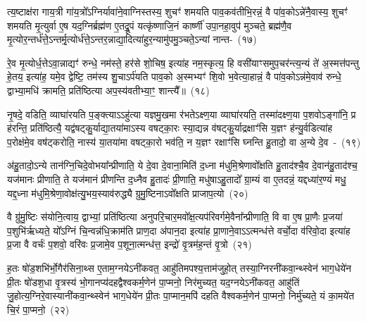 त्य॒ष्टाक्ष॑रा गाय॒त्री गा॑य॒त्रो᳚\-ऽग्निर्यावा॑ने॒वाग्निस्तस्य॒ शुचꣳ॑ शमयति पाव॒कव॑तीभि॒रन्नं॒ वै पा॑व॒को\-ऽन्ने॑नै॒वास्य॒ शुचꣳ॑ शमयति मृ॒त्युर्वा ए॒ष यद॒ग्निर्ब्रह्म॑ण ए॒तद्रू॒पं यत्कृ॑ष्णाजि॒नं कार्\mbox{}ष्णी॑ उपा॒नहा॒वुप॑ मुञ्चते॒ ब्रह्म॑णै॒व मृ॒त्योर॒न्तर्ध॑त्ते॒\-ऽन्तर्मृ॒त्योर्ध॑त्ते॒\-ऽन्तर॒न्नाद्या॒दित्या॑हुर॒न्यामु॑पमु॒ञ्चते॒\-ऽन्यां नान्त-~(१७)\ip

रे॒व मृ॒त्योर्ध॒त्ते\-ऽवा॒न्नाद्यꣳ॑ रुन्धे॒ नम॑स्ते॒ हर॑से शो॒चिष॒ इत्या॑ह नम॒स्कृत्य॒ हि वसी॑याꣳसमुप॒चर॑न्त्य॒न्यं ते॑ अ॒स्मत्त॑पन्तु हे॒तय॒ इत्या॑ह॒ यमे॒व द्वेष्टि॒ तम॑स्य शु॒चा\-ऽर्प॑यति पाव॒को अ॒स्मभ्यꣳ॑ शि॒वो भ॒वेत्या॒हान्नं॒ वै पा॑व॒को\-ऽन्न॑मे॒वाव॑ रुन्धे॒ द्वाभ्या॒मधि॑ क्रामति॒ प्रति॑ष्ठित्या अप॒स्य॑वतीभ्या॒ꣳ॒ शान्त्यै᳚॥~(१८)\ip

{\anuvakamend[{शुग्वे॑त॒सो॑\-ऽपाम॑ष्टा॒भिर्विक॑र्\mbox{}षति॒ नान्तरेका॒न्नप॑ञ्चा॒शच्च॑}]}

नृ॒षदे॒ वडिति॒ व्याघा॑रयति प॒ङ्क्त्या\-ऽऽहु॑त्या यज्ञमु॒खमा र॑भते\-ऽक्ष्ण॒या व्याघा॑रयति॒ तस्मा॑दक्ष्ण॒या प॒शवो\-ऽङ्गा॑नि॒ प्र ह॑रन्ति॒ प्रति॑ष्ठित्यै॒ यद्व॑षट्कु॒र्याद्या॒तया॑मा\-ऽस्य वषट्का॒रः स्या॒द्यन्न व॑षट्कु॒र्याद्रक्षाꣳ॑सि य॒ज्ञꣳ ह॑न्यु॒र्वडित्या॑ह प॒रोक्ष॑मे॒व वष॑ट्करोति॒ नास्य॑ या॒तया॑मा वषट्का॒रो भव॑ति॒ न य॒ज्ञꣳ रक्षाꣳ॑सि घ्नन्ति हु॒तादो॒ वा अ॒न्ये दे॒व~-~(१९)\ip

अ॑हु॒तादो॒\-ऽन्ये तान॑ग्नि॒चिदे॒वोभया᳚न्प्रीणाति॒ ये दे॒वा दे॒वाना॒मिति॑ द॒ध्ना म॑धुमि॒श्रेणावो᳚क्षति हु॒ताद॑श्चै॒व दे॒वान॑हु॒ताद॑श्च॒ यज॑मानः प्रीणाति॒ ते यज॑मानं प्रीणन्ति द॒ध्नैव हु॒तादः॑ प्री॒णाति॒ मधु॑षा\-ऽहु॒तादो᳚ ग्रा॒म्यं वा ए॒तदन्नं॒ यद्दध्या॑र॒ण्यं मधु॒ यद्द॒ध्ना म॑धुमि॒श्रेणा॒वोक्ष॑त्यु॒भय॒स्याव॑रुद्ध्यै ग्रुमु॒ष्टिना\-ऽवो᳚क्षति प्राजाप॒त्यो~(२०)\ip

वै ग्रु॑मु॒ष्टिः स॑योनि॒त्वाय॒ द्वाभ्यां॒ प्रति॑ष्ठित्या अनुपरि॒चार॒मवो᳚क्ष॒त्यप॑रिवर्गमे॒वैना᳚न्प्रीणाति॒ वि वा ए॒ष प्रा॒णैः प्र॒जया॑ प॒शुभि॑र्\mbox{}ऋध्यते॒ यो᳚\-ऽग्निं चि॒न्वन्न॑धि॒क्राम॑ति प्राण॒दा अ॑पान॒दा इत्या॑ह प्रा॒णाने॒वा\-ऽऽ\-त्मन्ध॑त्ते वर्चो॒दा व॑रिवो॒दा इत्या॑ह प्र॒जा वै वर्चः॑ प॒शवो॒ वरि॑वः प्र॒जामे॒व प॒शूना॒त्मन्ध॑त्त॒ इन्द्रो॑ वृ॒त्रम॑ह॒न्तं वृ॒त्रो~(२१)\ip

ह॒तः षो॑ड॒शभि॑र्भो॒गैर॑सिना॒थ्स ए॒ताम॒ग्नये\-ऽनी॑कवत॒ आहु॑तिमपश्य॒त्ताम॑जुहो॒त् तस्या॒ग्नि\-रनी॑कवा॒न्थ्स्वेन॑ भाग॒\-धेये॑न प्री॒तः षो॑डश॒धा वृ॒त्रस्य॑ भो॒गानप्य॑दहद्वैश्वकर्म॒णेन॑ पा॒प्मनो॒ निर॑मुच्यत॒ यद॒ग्नये\-ऽनी॑कवत॒ आहु॑तिं जु॒होत्य॒ग्निरे॒वास्यानी॑कवा॒न्थ्स्वेन॑ भाग॒\-धेये॑न प्री॒तः पा॒प्मान॒मपि॑ दहति वैश्वकर्म॒णेन॑ पा॒प्मनो॒ निर्मु॑च्यते॒ यं का॒मये॑त चि॒रं पा॒प्मनो॒~(२२)\ip

